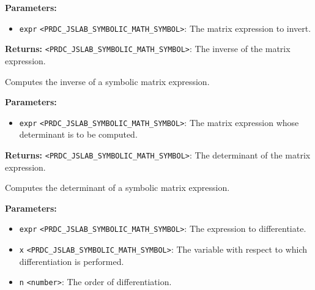 \documentclass[12pt,a4paper]{article}
\begin{document}
\vspace{5mm}
\noindent {}


\noindent \textbf{Parameters:}
\begin{itemize}
  \item \texttt{expr} \texttt{<PRDC\_JSLAB\_SYMBOLIC\_MATH\_SYMBOL>}: The matrix expression to invert.
\end{itemize}

\noindent \textbf{Returns:} \texttt{<PRDC\_JSLAB\_SYMBOLIC\_MATH\_SYMBOL>}: The inverse of the matrix expression.

\noindent Computes the inverse of a symbolic matrix expression.

\vspace{5mm}
\noindent {}


\noindent \textbf{Parameters:}
\begin{itemize}
  \item \texttt{expr} \texttt{<PRDC\_JSLAB\_SYMBOLIC\_MATH\_SYMBOL>}: The matrix expression whose determinant is to be computed.
\end{itemize}

\noindent \textbf{Returns:} \texttt{<PRDC\_JSLAB\_SYMBOLIC\_MATH\_SYMBOL>}: The determinant of the matrix expression.

\noindent Computes the determinant of a symbolic matrix expression.

\vspace{5mm}
\noindent {}


\noindent \textbf{Parameters:}
\begin{itemize}
  \item \texttt{expr} \texttt{<PRDC\_JSLAB\_SYMBOLIC\_MATH\_SYMBOL>}: The expression to differentiate.
  \item \texttt{x} \texttt{<PRDC\_JSLAB\_SYMBOLIC\_MATH\_SYMBOL>}: The variable with respect to which differentiation is performed.
  \item \texttt{n} \texttt{<number>}: The order of differentiation.
\end{itemize}
\end{document}
